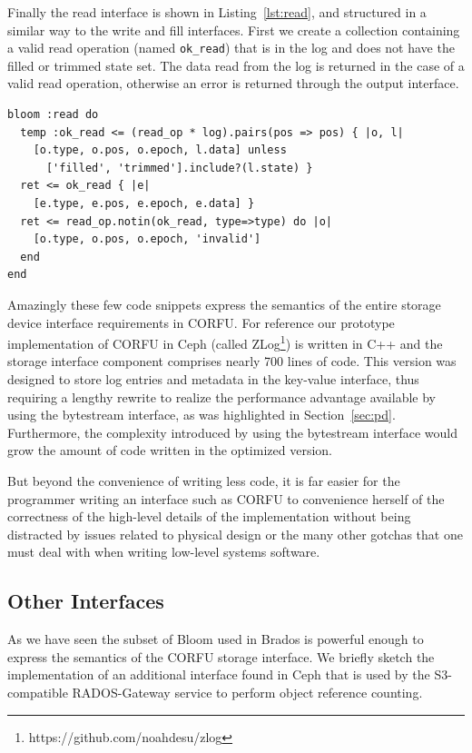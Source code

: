 \documentclass[10pt,twocolumn]{article}
\begin{document}
Finally the read interface is shown in Listing~\ref{lst:read}, and structured
in a similar way to the write and fill interfaces. First we create a collection
containing a valid read operation (named \texttt{ok\_read}) that is in the log
and does not have the filled or trimmed state set.  The data read from the log
is returned in the case of a valid read operation, otherwise an error is
returned through the output interface.

\begin{lstlisting}[caption={Read}, label=lst:read]
bloom :read do
  temp :ok_read <= (read_op * log).pairs(pos => pos) { |o, l|
    [o.type, o.pos, o.epoch, l.data] unless
      ['filled', 'trimmed'].include?(l.state) }
  ret <= ok_read { |e|
    [e.type, e.pos, e.epoch, e.data] }
  ret <= read_op.notin(ok_read, type=>type) do |o|
    [o.type, o.pos, o.epoch, 'invalid']
  end
end
\end{lstlisting}

Amazingly these few code snippets express the semantics of the entire storage
device interface requirements in CORFU. For reference our prototype
implementation of CORFU in Ceph (called
ZLog\footnote{https://github.com/noahdesu/zlog})
is written in C++ and the storage interface component comprises nearly 700
lines of code. This version
was designed to store log entries and metadata in the key-value interface,
thus requiring a lengthy rewrite to realize the performance advantage
available by using the bytestream interface, as was highlighted in
Section~\ref{sec:pd}. Furthermore, the complexity introduced by using the
bytestream interface would grow the amount of code written in the optimized
version.

But beyond the convenience of writing less code, it is far easier for the
programmer writing an interface such as CORFU to convenience herself of the
correctness of the high-level details of the implementation without being
distracted by issues related to physical design or the many other gotchas that
one must deal with when writing low-level systems software.

\subsection{Other Interfaces}
\label{sec:oi}

As we have seen the subset of Bloom used in Brados is powerful enough to
express the semantics of the CORFU storage interface. We briefly sketch the
implementation of an additional interface found in Ceph that is used by the
S3-compatible RADOS-Gateway service to perform object reference counting.
\end{document}
